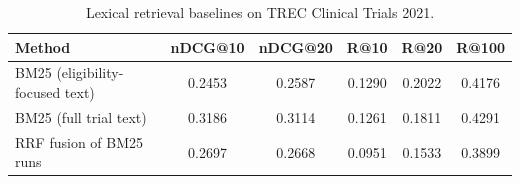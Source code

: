 \begin{table}[t]
\centering
\caption{Lexical retrieval baselines on TREC Clinical Trials 2021.}
\label{tab:retrieval_lexical}
\begin{tabular}{lccccc}
\hline
Method & nDCG@10 & nDCG@20 & R@10 & R@20 & R@100 \\
\hline
BM25 (eligibility-focused text) & 0.2453 & 0.2587 & 0.1290 & 0.2022 & 0.4176 \\
BM25 (full trial text) & 0.3186 & 0.3114 & 0.1261 & 0.1811 & 0.4291 \\
RRF fusion of BM25 runs & 0.2697 & 0.2668 & 0.0951 & 0.1533 & 0.3899 \\
\hline
\end{tabular}
\end{table}